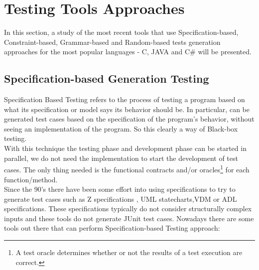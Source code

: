 \documentclass[a4paper,UKenglish]{oasics}
\begin{document}
\section{Testing Tools Approaches}\label{testingapproaches}
In this section, a study of the most recent tools that use Specification-based, Constraint-based, Grammar-based and Random-based tests generation
approaches for the most popular languages - C, JAVA and C\# will be presented.

\subsection{Specification-based Generation Testing}
Specification Based Testing refers to the process of testing a program based on what its specification or model says its behavior should be.
In particular, can be generated test cases based on the specification of the program's behavior, without seeing an implementation of the program. So this clearly a
way of Black-box testing.\\
With this technique the testing phase and development phase can be started in parallel, we do not need the implementation
to start the development of test cases. The only thing needed is the functional contracts and/or oracles\footnote{A test oracle determines whether or not the results of a test execution are correct\cite{Peters95generatinga}.} for each function/method.\\
Since the 90's there have been some effort into using specifications to try to generate test cases such as Z specifications
\cite{Horcher95improvingsoftware,Stocks:1996:FST:239916.239918}, UML statecharts\cite{Offutt:1999:GTU:1767297.1767341},VDM\cite{Aichernig99automatedblack-box}
or ADL specifications\cite{Sankar94specifyingand}.
These specifications typically do not consider structurally complex inputs and these tools do not generate JUnit test cases.
Nowadays there are some tools out there that can perform Specification-based Testing approach:
\end{document}
